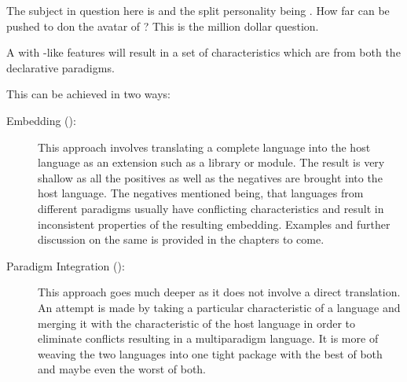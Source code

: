 \documentclass[thesis-solanki.tex]{subfiles}
\begin{document}
The subject in question here is  and the split personality being . How far can  be 
pushed to
don the avatar of ?
This is the million dollar question.

A  with -like features will result in a set of characteristics which are from
both the declarative paradigms.

This can be achieved in two ways:
\begin{description}
\item [Embedding ():]

  This approach involves translating a complete language into the host language as an extension such as a
  library or module.
  The result is very shallow
  as all the positives as well as the negatives are brought into the host language.
  The negatives mentioned being, that languages from different paradigms usually have conflicting characteristics
  and result in inconsistent properties of the resulting embedding.
  Examples and further discussion on the same is provided in the chapters to come.

\item [Paradigm Integration ():]

  This approach goes much deeper as it does not involve a direct translation.
  An attempt is made by taking a particular characteristic of a language and merging it with the characteristic of
  the host language in order to eliminate conflicts resulting in a multiparadigm language.
  It is more of weaving the two languages into one tight package with the best of both and maybe even the worst of
  both.
\end{description}


%
\end{document}
